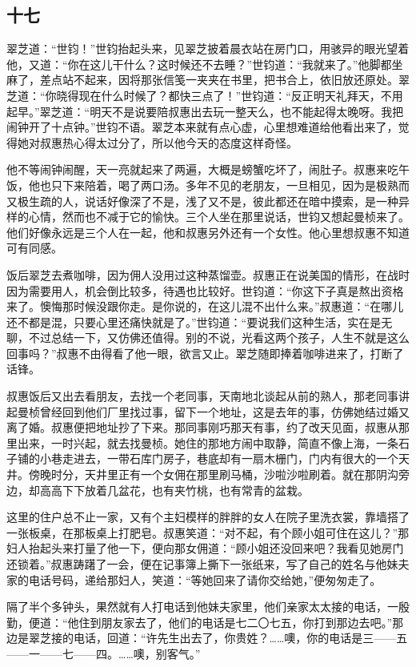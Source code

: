\subsection{十七}


\par 翠芝道：“世钧！”世钧抬起头来，见翠芝披着晨衣站在房门口，用骇异的眼光望着他，又道：“你在这儿干什么？这时候还不去睡？”世钧道：“我就来了。”他脚都坐麻了，差点站不起来，因将那张信笺一夹夹在书里，把书合上，依旧放还原处。翠芝道：“你晓得现在什么时候了？都快三点了！”世钧道：“反正明天礼拜天，不用起早。”翠芝道：“明天不是说要陪叔惠出去玩一整天么，也不能起得太晚呀。我把闹钟开了十点钟。”世钧不语。翠芝本来就有点心虚，心里想难道给他看出来了，觉得她对叔惠热心得太过分了，所以他今天的态度这样奇怪。
\par 他不等闹钟闹醒，天一亮就起来了两遍，大概是螃蟹吃坏了，闹肚子。叔惠来吃午饭，他也只下来陪着，喝了两口汤。多年不见的老朋友，一旦相见，因为是极熟而又极生疏的人，说话好像深了不是，浅了又不是，彼此都还在暗中摸索，是一种异样的心情，然而也不减于它的愉快。三个人坐在那里说话，世钧又想起曼桢来了。他们好像永远是三个人在一起，他和叔惠另外还有一个女性。他心里想叔惠不知道可有同感。
\par 饭后翠芝去煮咖啡，因为佣人没用过这种蒸馏壶。叔惠正在说美国的情形，在战时因为需要用人，机会倒比较多，待遇也比较好。世钧道：“你这下子真是熬出资格来了。懊悔那时候没跟你走。是你说的，在这儿混不出什么来。”叔惠道：“在哪儿还不都是混，只要心里还痛快就是了。”世钧道：“要说我们这种生活，实在是无聊，不过总结一下，又仿佛还值得。别的不说，光看这两个孩子，人生不就是这么回事吗？”叔惠不由得看了他一眼，欲言又止。翠芝随即捧着咖啡进来了，打断了话锋。
\par 叔惠饭后又出去看朋友，去找一个老同事，天南地北谈起从前的熟人，那老同事讲起曼桢曾经回到他们厂里找过事，留下一个地址，这是去年的事，仿佛她结过婚又离了婚。叔惠便把地址抄了下来。那同事刚巧那天有事，约了改天见面，叔惠从那里出来，一时兴起，就去找曼桢。她住的那地方闹中取静，简直不像上海，一条石子铺的小巷走进去，一带石库门房子，巷底却有一扇木栅门，门内有很大的一个天井。傍晚时分，天井里正有一个女佣在那里刷马桶，沙啦沙啦刷着。就在那阴沟旁边，却高高下下放着几盆花，也有夹竹桃，也有常青的盆栽。
\par 这里的住户总不止一家，又有个主妇模样的胖胖的女人在院子里洗衣裳，靠墙搭了一张板桌，在那板桌上打肥皂。叔惠笑道：“对不起，有个顾小姐可住在这儿？”那妇人抬起头来打量了他一下，便向那女佣道：“顾小姐还没回来吧？我看见她房门还锁着。”叔惠踌躇了一会，便在记事簿上撕下一张纸来，写了自己的姓名与他妹夫家的电话号码，递给那妇人，笑道：“等她回来了请你交给她，”便匆匆走了。
\par 隔了半个多钟头，果然就有人打电话到他妹夫家里，他们亲家太太接的电话，一殷勤，便道：“他住到朋友家去了，他们的电话是七二〇七五，你打到那边去吧。”那边是翠芝接的电话，回道：“许先生出去了，你贵姓？……噢，你的电话是三——五——一——七——四。……噢，别客气。”
